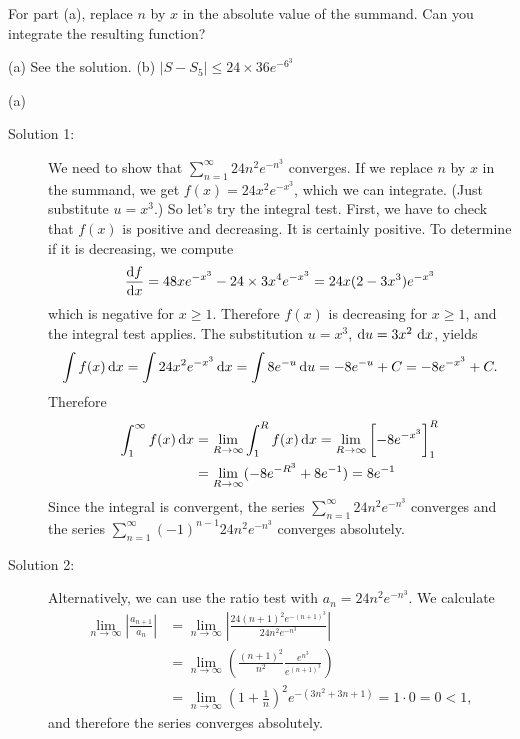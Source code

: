 \begin{hint}
For part (a), replace $n$ by $x$ in the absolute value of the summand.
Can you integrate the resulting function?
\end{hint}

\begin{answer}
(a) See the solution.
\qquad (b)
$|S - S_5 | \le  24 \times 36 e^{-6^3}$

\end{answer}

\begin{solution} (a)
\begin{description}
\item[Solution 1:]
We need to show that
$\sum\limits_{n=1}^\infty 24n^2 e^{-n^3}$ converges.
If we replace $n$ by $x$ in the summand, we get $f(x) = 24x^2 e^{-x^3}$,
which we can integrate. (Just substitute $u=x^3$.)
So let's try the integral test.
First, we have to check that $f(x)$ is positive and decreasing.
It is certainly positive. To determine if it is decreasing, we compute
\begin{align*}
\diff{f}{x} = 48x e^{-x^3} - 24\times 3 x^4 e^{-x^3}
= 24x (2-3x^3) e^{-x^3}
\end{align*}
which is negative for $x\ge1$. Therefore $f(x)$ is decreasing for $x\ge1$,
and the integral test applies. The substitution $u=x^3$,
$\mathrm{d}u=3x^2\,\,\mathrm{d}x$, yields
\begin{align*}
\int f(x) \,\mathrm{d}x
= \int 24x^2 e^{-x^3} \,\mathrm{d}x = \int 8 e^{-u}\,\mathrm{d}u = -8e^{-u} + C = -8e^{-x^3} + C.
\end{align*}
Therefore
\begin{align*}
\int_1^\infty f(x) \,\mathrm{d}x &= \lim_{R \to \infty} \int_1^R f(x) \,\mathrm{d}x
  = \lim_{R \to \infty} \bigg[ {-}8 e^{-x^3} \bigg]_1^R  \\
   &= \lim_{R \to \infty} ( - 8 e^{-R^3} + 8 e^{-1}  ) = 8 e^{-1}
\end{align*}
Since the integral is convergent, the series
$\sum\limits_{n=1}^\infty 24n^2 e^{-n^3}$ converges
and the series $\displaystyle \sum_{n=1}^\infty (-1)^{n-1}24n^2 e^{-n^3}$
converges absolutely.

\item[Solution 2:]
Alternatively, we can use the ratio test with $a_n=24n^2 e^{-n^3}$.
We calculate
\begin{align*}
\lim_{n\to\infty} \left|\frac{a_{n+1}}{a_n}\right|
&= \lim_{n\to\infty} \left|\frac{24 (n+1)^2e^{-(n+1)^3}}{24 n^2e^{-n^3}} \right| \\
&= \lim_{n\to\infty} \left( \frac{(n+1)^2}{n^2} \frac{e^{n^3}}{e^{(n+1)^3}} \right) \\
&= \lim_{n\to\infty} \left(1+\frac{1}{n}\right)^2 e^{-(3n^2+3n+1)} = 1\cdot0=0 < 1,
\end{align*}
and therefore the series converges absolutely.


\end{description}
\end{solution}
